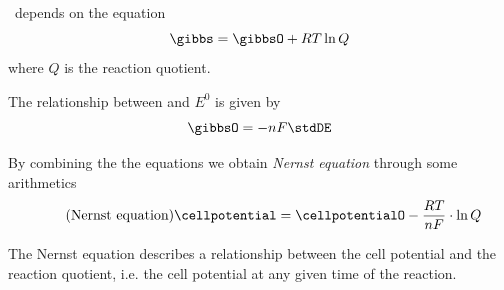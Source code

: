\documentclass[../mit-general-chemistry.tex]{subfiles}
\begin{document}
\gibbs\ depends on the equation
\begin{equation}
  \gibbs = \gibbsO + RT \ln Q
\end{equation}
where $Q$ is the reaction quotient.

The relationship between \gibbsO and $E^0$ is given by
\begin{equation}
  \gibbsO = -nF\stdDE
\end{equation}

By combining the the equations we obtain {\em Nernst equation} through
some arithmetics
\begin{equation}\tag{Nernst equation}\label{eq:Nernst equation}
  \cellpotential
  =  \cellpotentialO - \frac{RT}{nF}\cdot \ln Q
\end{equation}

The Nernst equation describes a relationship between the cell
potential and the reaction quotient, i.e. the cell potential at any
given time of the reaction.
\end{document}
